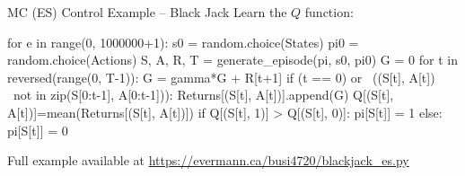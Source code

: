 \documentclass[ignorenonframetext,xcolor=x11names]{beamer}
\begin{document}
\begin{frame}[fragile]{MC (ES) Control Example -- Black Jack}
Learn the $Q$ function:
\begin{pythoncode}
for e in range(0, 1000000+1):
    s0 = random.choice(States)
    pi0 = random.choice(Actions)
    S, A, R, T = generate_episode(pi, s0, pi0)
    G = 0
    for t in reversed(range(0, T-1)):
        G = gamma*G + R[t+1]
        if (t == 0) or \
               ((S[t], A[t]) \
                      not in zip(S[0:t-1], A[0:t-1])):
            Returns[(S[t], A[t])].append(G)
            Q[(S[t], A[t])]=mean(Returns[(S[t], A[t])])
            if Q[(S[t], 1)] > Q[(S[t], 0)]:
                pi[S[t]] = 1
            else:
                pi[S[t]] = 0
\end{pythoncode}

Full example available at \url{https://evermann.ca/busi4720/blackjack_es.py}
\end{frame}
\end{document}
